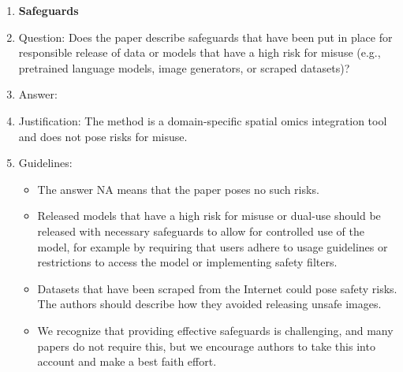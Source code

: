 \documentclass{article}
\theoremstyle{plain}
\theoremstyle{definition}
\begin{document}
\begin{enumerate}
  \item {\bf Safeguards}
  \item[] Question: Does the paper describe safeguards that have been put in place for responsible release of data or models that have a high risk for misuse (e.g., pretrained language models, image generators, or scraped datasets)?
  \item[] Answer: \answerNA{}
  \item[] Justification: The method is a domain-specific spatial omics integration tool and does not pose risks for misuse.
  \item[] Guidelines:
    \begin{itemize}
      \item The answer NA means that the paper poses no such risks.
      \item Released models that have a high risk for misuse or dual-use should be released with necessary safeguards to allow for controlled use of the model, for example by requiring that users adhere to usage guidelines or restrictions to access the model or implementing safety filters.
      \item Datasets that have been scraped from the Internet could pose safety risks. The authors should describe how they avoided releasing unsafe images.
      \item We recognize that providing effective safeguards is challenging, and many papers do not require this, but we encourage authors to take this into account and make a best faith effort.
    \end{itemize}


\end{enumerate}
\end{document}
